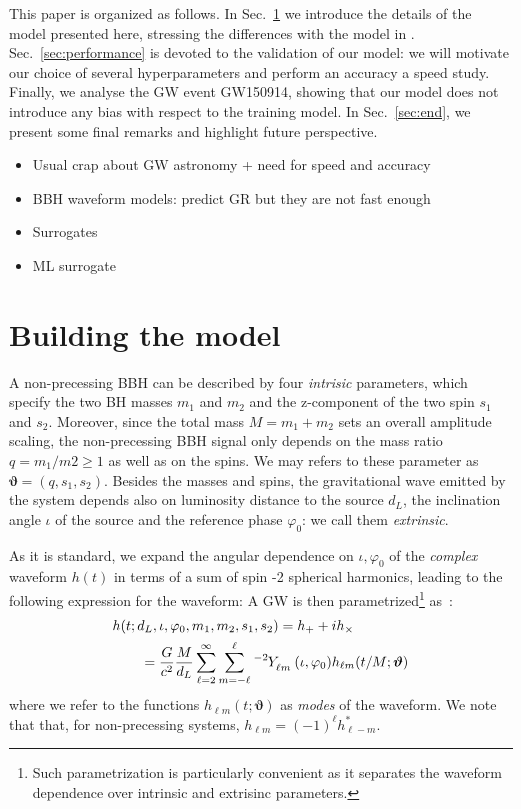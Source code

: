 \documentclass[twocolumn,showpacs,preprintnumbers,nofootinbib,prd,
superscriptaddress,10pt]{revtex4-1}
\begin{document}
This paper is organized as follows. In Sec.~\ref{sec:model} we introduce the details of the model presented here, stressing the differences with the model in  \cite{Schmidt:2020yuu}.
Sec.~\ref{sec:performance} is devoted to the validation of our model: we will motivate our choice of several hyperparameters and perform an accuracy a speed study. Finally, we analyse the GW event GW150914, showing that our model does not introduce any bias with respect to the training model.
In Sec.~\ref{sec:end}, we present some final remarks and highlight future perspective.

\begin{itemize}
	\item Usual crap about GW astronomy + need for speed and accuracy
	\item BBH waveform models: predict GR but they are not fast enough
	\item Surrogates
	\item ML surrogate
\end{itemize}


 \cite{Schmidt:2020yuu}

\section{Building the model}
\label{sec:model}

A non-precessing BBH can be described by four {\it intrisic} parameters, which specify the two BH masses $m_1$ and $m_2$ and the z-component of the two spin $s_1$ and $s_2$.
Moreover, since the total mass $M = m_1 + m_2$ sets an overall amplitude scaling, the non-precessing BBH signal only depends on the mass ratio $q = m_1/m2 \geq 1$ as well as on the spins. We may refers to these parameter as $\boldsymbol{\vartheta} = (q, s_1, s_2)$.
Besides the masses and spins, the gravitational wave emitted by the system depends also on luminosity distance to the source $d_L$, the inclination angle $\iota$ of the source and the reference phase $\varphi_0$: we call them {\it extrinsic}.

As it is standard, we expand the angular dependence on $\iota, \varphi_0$ of the {\it complex} waveform $h(t)$ in terms of a sum of spin -2 spherical harmonics, leading to the following expression for the waveform:
A GW is then parametrized\footnote{Such parametrization is particularly convenient as it separates the waveform dependence over intrinsic and extrisinc parameters.} as~\cite{Estelles:2021gvs}:
\begin{align} \label{eq:h_parametrization}
	&h(t; d_L,\iota,\varphi_0, m_1, m_2, s_1, s_2) = h_+ + i h_\times \nonumber \\
		&\qquad= \frac{G}{c^2} \frac{M}{d_L}\sum_{\ell = 2}^{\infty} \sum_{m = -\ell}^{\ell} \tensor[^{-2}]{Y}{_{\ell m}}(\iota, \varphi_0) h_{\ell m}(t/M; \boldsymbol{\vartheta})
\end{align}
where we refer to the functions $h_{\ell m}(t; \boldsymbol{\vartheta})$ as {\it modes} of the waveform. We note that that, for non-precessing systems, $h_{\ell m} = (-1)^\ell h^*_{\ell -m}$.
\end{document}
